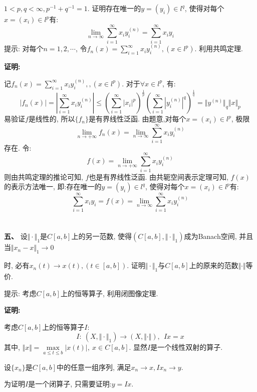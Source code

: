 \documentclass{article}
\begin{document}
\hspace{2em} $1< p, q < \infty, p^{-1} + q^{-1} = 1$. 证明存在唯一的$y=(y_i) \in l^q$, 使得对每个$x=(x_i) \in l^p$有:
$$ \lim\limits_{n \rightarrow \infty} \sum\limits_{i=1}^{\infty} x_iy_i^{(n)} = \sum\limits_{i=1}^{\infty} x_iy_i $$
\hspace{3em} 提示: 对每个$n=1,2,\cdots$, 令$f_n(x) = \sum\limits_{i=1}^{\infty} x_iy_i^{(n)}, (x \in l^p)$. 利用共鸣定理. 

\textbf{证明:}

记$f_n(x) = \sum\limits_{i=1}^{\infty} x_iy_i^{(n)}, , (x \in l^p)$. 对于$\forall x \in l^p$, 有:
$$ |f_n(x)| = |\sum\limits_{i=1}^{\infty} x_i y_i^{(n)}| \leq \left( \sum\limits_{i=1}^{\infty} |x_i|^p \right)^{\frac{1}{p}} \left( \sum\limits_{i=1}^{\infty} |y_i^{(n)}|^q \right)^{\frac{1}{q}} =  \Vert y^{(n)} \Vert_q \Vert x \Vert_p$$
易验证$f$是线性的, 所以$\{ f_n \}$是有界线性泛函. 由题意,对每个$x=(x_i) \in l^p$, 极限
$$ \lim\limits_{n \rightarrow +\infty} f_n(x) = \lim\limits_{n \rightarrow \infty} \sum\limits_{i=1}^{\infty} x_iy_i^{(n)} $$
存在. 令:
$$ f(x) = \lim\limits_{n \rightarrow +\infty} \sum\limits_{i=1}^{\infty} x_iy_i^{(n)} $$
则由共鸣定理的推论可知, $f$也是有界线性泛函. 由共轭空间表示定理可知, $f(x)$的表示方法唯一, 即:存在唯一的$y=(y_i) \in l^q$, 使得对每个$x=(x_i) \in l^p$有:
$$ \sum\limits_{i=1}^{\infty} x_iy_i = f(x) = \lim\limits_{n \rightarrow \infty} \sum\limits_{i=1}^{\infty} x_iy_i^{(n)} $$\\  \\  


\textbf{五、} 设$\Vert \cdot \Vert_1$是$C[a,b]$上的另一范数, 使得$(C[a,b], \Vert \cdot \Vert_1)$成为Banach空间, 并且当$\Vert  x_n - x \Vert_1 \rightarrow 0$

\hspace{2em} 时, 必有$x_n(t) \rightarrow x(t), (t \in [a,b])$. 证明$\Vert \cdot \Vert_1$与$C[a,b]$上的原来的范数$\Vert \cdot \Vert$等价.  

\hspace{3em} 提示: 考虑$C[a,b]$上的恒等算子, 利用闭图像定理. 

\textbf{证明:} 

考虑$C[a,b]$上的恒等算子$I$:
$$ I: \ (X, \Vert \cdot \Vert_1) \rightarrow (X, \Vert \cdot \Vert), \ \ Ix = x $$
其中, $\Vert x \Vert = \max\limits_{a \leq t \leq b} |x(t)|, \ x \in C[a, b]$. 显然$I$是一个线性双射的算子. 

设$\{x_n\}$是$C[a,b]$中的任意一组序列, 满足$x_n \rightarrow x, Ix_n \rightarrow y$.

为证明$I$是一个闭算子, 只需要证明:$y=Ix$.
\end{document}
